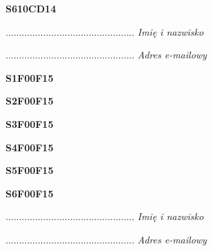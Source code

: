 \begin{turn}{90}\huge \textbf{S610CD14}\end{turn}

\begin{turn}{90}\begin{minipage}{\linewidth} \vspace{20mm} ................................................  \textit{Imię i nazwisko}\end{minipage}\end{turn}

\begin{turn}{90}\begin{minipage}{\linewidth} \vspace{20mm} ................................................  \textit{Adres e-mailowy}\end{minipage}\end{turn}

\begin{turn}{90}\huge \textbf{S1F00F15}\end{turn}

\begin{turn}{90}\huge \textbf{S2F00F15}\end{turn}

\begin{turn}{90}\huge \textbf{S3F00F15}\end{turn}

\begin{turn}{90}\huge \textbf{S4F00F15}\end{turn}

\begin{turn}{90}\huge \textbf{S5F00F15}\end{turn}

\begin{turn}{90}\huge \textbf{S6F00F15}\end{turn}

\begin{turn}{90}\begin{minipage}{\linewidth} \vspace{20mm} ................................................  \textit{Imię i nazwisko}\end{minipage}\end{turn}

\begin{turn}{90}\begin{minipage}{\linewidth} \vspace{20mm} ................................................  \textit{Adres e-mailowy}\end{minipage}\end{turn}

